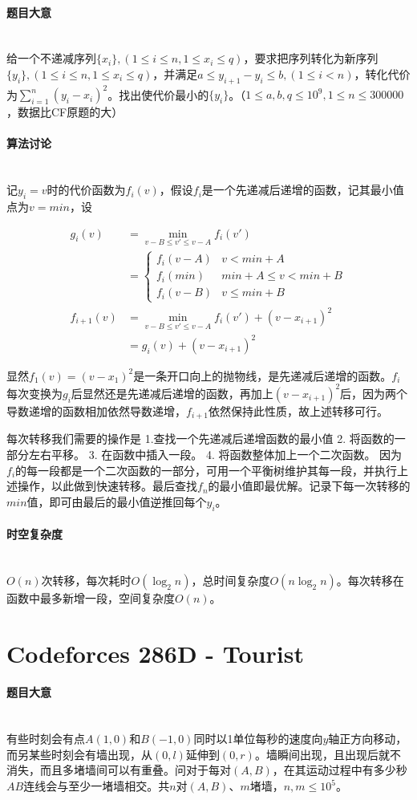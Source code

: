\documentclass[UTF8]{ctexart}
\newcommand{\myparagraph}[1]{\paragraph{#1}\mbox{}\\}
\theoremstyle{nonumberplain}
\begin{document}
		\myparagraph{题目大意}
		
			给一个不递减序列$\{x_i\},(1 \leq i \leq n, 1 \leq x_i \leq q)$，要求把序列转化为新序列$\{y_i\},(1 \leq i \leq n, 1 \leq x_i \leq q)$，并满足$a \leq y_{i+1}-y_i \leq b,(1 \leq i < n)$，转化代价为$\sum_{i=1}^n(y_i-x_i)^2$。找出使代价最小的$\{y_i\}$。（$1 \leq a,b,q \leq 10^9, 1 \leq n \leq 300000$，数据比CF原题的大）
		
		\myparagraph{算法讨论}
			
			记$y_i=v$时的代价函数为$f_i(v)$，假设$f_i$是一个先递减后递增的函数，记其最小值点为$v=min$，设
			
			$$\begin{aligned}
				g_i(v)&=\min_{v-B \leq v' \leq v-A}f_i(v')\\
				      &=\begin{cases}
				           f_i(v-A) & v < min+A \\
						   f_i(min) & min+A \leq v < min+B \\
						   f_i(v-B) & v \leq min+B
						\end{cases} \\
				f_{i+1}(v)&=\min_{v-B \leq v' \leq v-A}f_i(v')+(v-x_{i+1})^2 \\
				          &=g_i(v)+(v-x_{i+1})^2
			\end{aligned}$$
			
			显然$f_1(v)=(v-x_1)^2$是一条开口向上的抛物线，是先递减后递增的函数。$f_i$每次变换为$g_i$后显然还是先递减后递增的函数，再加上$(v-x_{i+1})^2$后，因为两个导数递增的函数相加依然导数递增，$f_{i+1}$依然保持此性质，故上述转移可行。
			
			每次转移我们需要的操作是 1.查找一个先递减后递增函数的最小值 2. 将函数的一部分左右平移。 3. 在函数中插入一段。 4. 将函数整体加上一个二次函数。 因为$f_i$的每一段都是一个二次函数的一部分，可用一个平衡树维护其每一段，并执行上述操作，以此做到快速转移。最后查找$f_n$的最小值即最优解。记录下每一次转移的$min$值，即可由最后的最小值逆推回每个$y_i$。
			
		\myparagraph{时空复杂度}
		
			$O(n)$次转移，每次耗时$O(\log_2n)$，总时间复杂度$O(n\log_2n)$。每次转移在函数中最多新增一段，空间复杂度$O(n)$。
	
	\section{Codeforces 286D - Tourist}
	
		\myparagraph{题目大意}
		
			有些时刻会有点$A(1,0)$和$B(-1,0)$同时以1单位每秒的速度向$y$轴正方向移动，而另某些时刻会有墙出现，从$(0,l)$延伸到$(0,r)$。墙瞬间出现，且出现后就不消失，而且多堵墙间可以有重叠。问对于每对$(A,B)$，在其运动过程中有多少秒$AB$连线会与至少一堵墙相交。共$n$对$(A,B)$、$m$堵墙，$n,m \leq 10^5$。
		
\end{document}
